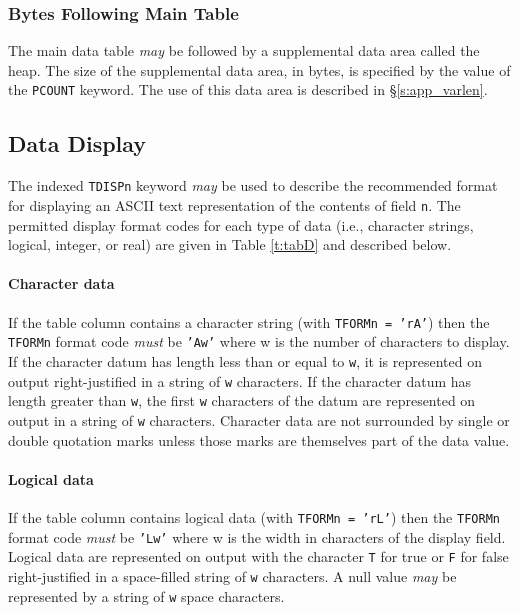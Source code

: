 \documentclass[11pt,makeidx]{book}     %
\begin{document}
    \subsubsection{Bytes Following Main Table}

    The main data table {\em may} be followed by a supplemental data area called the heap. 
    The size of the supplemental data area, in bytes, is specified by the value of the 
    {\tt PCOUNT} keyword. The use of this data area is described in 
    \S\ref{s:app_varlen}. 

 \subsection{Data Display}
 \label{s:BinDD}
 
 The indexed {\tt TDISPn} keyword {\em may} be used to describe the 
 recommended format for displaying an ASCII text representation 
 of the contents of field {\tt n}.
 The permitted display format codes for each 
 type of data (i.e., character strings, logical, integer, or real)
 are given in Table \ref{t:tabD} and described below.

 \paragraph{Character data} If the table column contains 
 a character string (with {\tt TFORMn = 'rA'}) then the {\tt TFORMn} 
 format code {\em must} be {\tt 'Aw'} where w is the number of characters
 to display.  If the
 character datum has length less than or equal to {\tt w}, it is represented
 on output right-justified in a string of {\tt w} characters.  If the
 character datum has length greater than {\tt w}, the first {\tt w} characters
 of the datum are represented on output in a string of {\tt w} characters.
 Character data are not surrounded by single or double quotation marks
 unless those marks are themselves part of the data value.
                                                  
 \paragraph{Logical data} If the table column contains logical data
 (with {\tt TFORMn = 'rL'}) then the {\tt TFORMn} 
 format code {\em must} be {\tt 'Lw'\/} where w is the width in characters
 of the display field.  Logical
 data are represented on output with the character {\tt T} for true
 or {\tt F} for false right-justified in a space-filled string of
 {\tt w} characters.  A null value {\em may} be represented by a 
 string of {\tt w} space characters.
\end{document}
